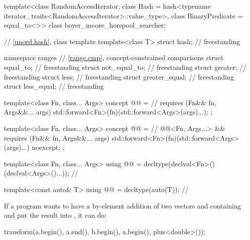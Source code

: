 \begin{codeblock}
{  template<class RandomAccessIterator,
           class Hash = hash<typename iterator_traits<RandomAccessIterator>::value_type>,
           class BinaryPredicate = equal_to<>>
    class boyer_moore_horspool_searcher;

  // \ref{unord.hash}, class template 
  template<class T>
    struct hash;                                                                    // freestanding

  namespace ranges {
    // \ref{range.cmp}, concept-constrained comparisons
    struct equal_to;                                                                // freestanding
    struct not_equal_to;                                                            // freestanding
    struct greater;                                                                 // freestanding
    struct less;                                                                    // freestanding
    struct greater_equal;                                                           // freestanding
    struct less_equal;                                                              // freestanding
  }

  template<class Fn, class... Args>
    concept @@ =                                                  // \expos
      requires (Fn&& fn, Args&&... args) {
        std::forward<Fn>(fn)(std::forward<Args>(args)...);
      };

  template<class Fn, class... Args>
    concept @@ =                                          // \expos
      @@<Fn, Args...> &&
      requires (Fn&& fn, Args&&... args) {
        { std::forward<Fn>(fn)(std::forward<Args>(args)...) } noexcept;
      };

  template<class Fn, class... Args>
    using @@ = decltype(declval<Fn>()(declval<Args>()...));  // \expos

  template<const auto& T>
    using @@ = decltype(auto(T));                           // \expos
}
\end{codeblock}

\pnum
\begin{example}
If a \Cpp{} program wants to have a by-element addition of two vectors 
and  containing  and put the result into ,
it can do:

\begin{codeblock}
transform(a.begin(), a.end(), b.begin(), a.begin(), plus<double>());
\end{codeblock}
\end{example}

